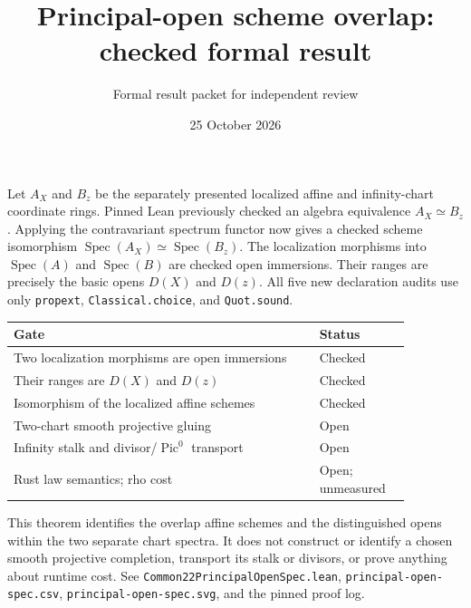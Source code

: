 \documentclass[11pt]{article}
\title{Principal-open scheme overlap: checked formal result}
\author{Formal result packet for independent review}
\date{25 October 2026}
\begin{document}
\maketitle
Let $A_X$ and $B_z$ be the separately presented localized affine and infinity-chart coordinate rings. Pinned Lean previously checked an algebra equivalence $A_X\simeq B_z$. Applying the contravariant spectrum functor now gives a checked scheme isomorphism $\operatorname{Spec}(A_X)\simeq\operatorname{Spec}(B_z)$. The localization morphisms into $\operatorname{Spec}(A)$ and $\operatorname{Spec}(B)$ are checked open immersions. Their ranges are precisely the basic opens $D(X)$ and $D(z)$. All five new declaration audits use only \texttt{propext}, \texttt{Classical.choice}, and \texttt{Quot.sound}.

\begin{center}\begin{tabular}{p{0.67\linewidth}p{0.2\linewidth}}\toprule
Gate & Status\\\midrule
Two localization morphisms are open immersions & Checked\\
Their ranges are $D(X)$ and $D(z)$ & Checked\\
Isomorphism of the localized affine schemes & Checked\\
Two-chart smooth projective gluing & Open\\
Infinity stalk and divisor/$\operatorname{Pic}^0$ transport & Open\\
Rust law semantics; rho cost & Open; unmeasured\\\bottomrule\end{tabular}\end{center}

This theorem identifies the overlap affine schemes and the distinguished opens within the two separate chart spectra. It does not construct or identify a chosen smooth projective completion, transport its stalk or divisors, or prove anything about runtime cost. See \texttt{Common22PrincipalOpenSpec.lean}, \texttt{principal-open-spec.csv}, \texttt{principal-open-spec.svg}, and the pinned proof log.
\end{document}
